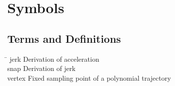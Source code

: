 \chapter*{Symbols}\label{chap:symbole}


% 

\section*{Terms and Definitions}
\begin{tabbing}
 \hspace*{1.6cm}  \= \kill
jerk \> Derivation of acceleration \\[0.5ex]
snap \> Derivation of jerk \\[0.5ex]
vertex \> Fixed sampling point of a polynomial trajectory \\[0.5ex]
\end{tabbing}

